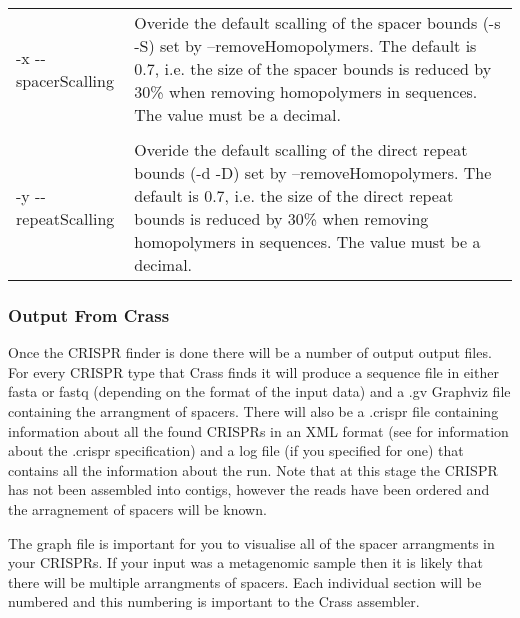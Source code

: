 \documentclass[11pt]{article} %
\begin{document}
\begin{longtable}{  l   p{10cm} }
-x -{}-spacerScalling & Overide the default scalling of the spacer bounds (-s -S) set by --removeHomopolymers.  The default is 0.7, i.e. the size of the spacer bounds is reduced by 30\% when removing homopolymers in sequences.  The value must be a decimal.   \\ \\
-y -{}-repeatScalling & Overide the default scalling of the direct repeat bounds (-d -D) set by --removeHomopolymers.  The default is 0.7, i.e. the size of the direct repeat bounds is reduced by 30\% when removing homopolymers in sequences.  The value must be a decimal.\\ 
\hline
    \end{longtable}
\subsubsection{Output From Crass}
Once the CRISPR finder is done there will be a number of output output files.  For every CRISPR type that Crass finds it will produce a sequence file in either fasta or fastq (depending on the format of the input data) and a .gv Graphviz file containing the arrangment of spacers.  There will also be a .crispr file containing information about all the found CRISPRs in an XML format (see  for information about the .crispr specification) and a log file (if you specified for one) that contains all the information about the run. Note that at this stage the CRISPR has not been assembled into contigs, however the reads have been ordered and the arragnement of spacers will be known.

The graph file is important for you to visualise all of the spacer arrangments in your CRISPRs.  If your input was a metagenomic sample then it is likely that there will be multiple arrangments of spacers.  Each individual section will be numbered and this numbering is important to the Crass assembler.   
\end{document}
